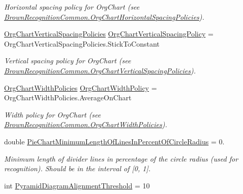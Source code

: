 \begin{DoxyCompactItemize}
\begin{DoxyCompactList}\small\item\em \-Horizontal spacing policy for \-Org\-Chart (see \hyperlink{namespace_brown_recognition_common_ac84ab02b07772204f06e83ed86500823}{\-Brown\-Recognition\-Common.\-Org\-Chart\-Horizontal\-Spacing\-Policies}). \end{DoxyCompactList}\item 
\hyperlink{namespace_brown_recognition_common_a1396f230cbda4b33de9ba5d56c9790c7}{\-Org\-Chart\-Vertical\-Spacing\-Policies} \hyperlink{class_brown_recognition_common_1_1_brown_recognition_settings_a29ff8c34c5e364b7056b2ed2dbfaa168}{\-Org\-Chart\-Vertical\-Spacing\-Policy} = \-Org\-Chart\-Vertical\-Spacing\-Policies.\-Stick\-To\-Constant
\begin{DoxyCompactList}\small\item\em \-Vertical spacing policy for \-Org\-Chart (see \hyperlink{namespace_brown_recognition_common_a1396f230cbda4b33de9ba5d56c9790c7}{\-Brown\-Recognition\-Common.\-Org\-Chart\-Vertical\-Spacing\-Policies}). \end{DoxyCompactList}\item 
\hyperlink{namespace_brown_recognition_common_a8e1f3265a68d8df8c7cc278d6c116a7d}{\-Org\-Chart\-Width\-Policies} \hyperlink{class_brown_recognition_common_1_1_brown_recognition_settings_a87fcc23a39461e192c45c40e6a8bb349}{\-Org\-Chart\-Width\-Policy} = \-Org\-Chart\-Width\-Policies.\-Average\-On\-Chart
\begin{DoxyCompactList}\small\item\em \-Width policy for \-Org\-Chart (see \hyperlink{namespace_brown_recognition_common_a8e1f3265a68d8df8c7cc278d6c116a7d}{\-Brown\-Recognition\-Common.\-Org\-Chart\-Width\-Policies}). \end{DoxyCompactList}\item 
double \hyperlink{class_brown_recognition_common_1_1_brown_recognition_settings_a7dc0caa3bfece8c6a17a64e2cf519e0d}{\-Pie\-Chart\-Minimum\-Length\-Of\-Lines\-In\-Percent\-Of\-Circle\-Radius} = 0.
\begin{DoxyCompactList}\small\item\em \-Minimum length of divider lines in percentage of the circle radius (used for recognition). \-Should be in the interval of \mbox{[}0, 1\mbox{]}. \end{DoxyCompactList}\item 
int \hyperlink{class_brown_recognition_common_1_1_brown_recognition_settings_a280bfefaddf7e6549e13715ead005853}{\-Pyramid\-Diagram\-Alignment\-Threshold} = 10

\end{DoxyCompactItemize}
